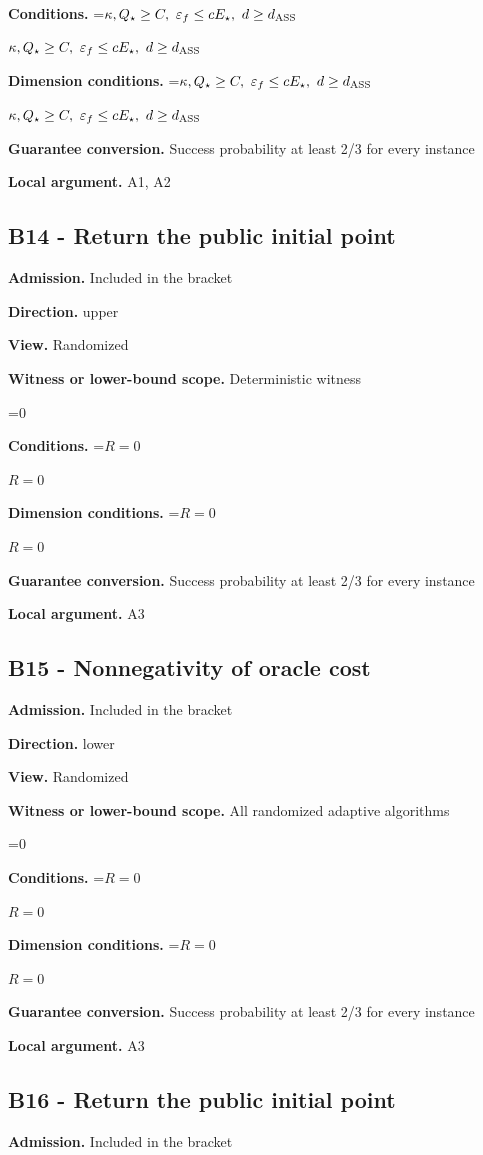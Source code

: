 \documentclass[10pt,a4paper]{article}
\newcommand{\AtlasMath}[1]{\par\begingroup\centering\setbox0=\hbox{$\displaystyle #1$}\ifdim\wd0>1.4\linewidth\typeout{ATLAS WIDE FORMULA: \the\wd0}\fi\ifdim\wd0>\linewidth\resizebox{\linewidth}{!}{\box0}\else\box0\fi\par\endgroup}
\newcommand{\AtlasInlineMath}[1]{\begingroup\setbox0=\hbox{$#1$}\ifdim\wd0>.4\linewidth\endgroup\AtlasMath{#1}\else\endgroup$#1$\fi}
\begin{document}
\textbf{Conditions.} \AtlasInlineMath{\kappa,Q_\star\ge C,\ \varepsilon_f\le cE_\star,\ d\ge d_{\rm ASS}}

\textbf{Dimension conditions.} \AtlasInlineMath{\kappa,Q_\star\ge C,\ \varepsilon_f\le cE_\star,\ d\ge d_{\rm ASS}}

\textbf{Guarantee conversion.} Success probability at least 2/3 for every instance

\textbf{Local argument.} A1, A2

\subsection{B14 - Return the public initial point}
\textbf{Admission.} Included in the bracket

\textbf{Direction.} upper

\textbf{View.} Randomized

\textbf{Witness or lower-bound scope.} Deterministic witness

\AtlasMath{0}
\textbf{Conditions.} \AtlasInlineMath{R=0}

\textbf{Dimension conditions.} \AtlasInlineMath{R=0}

\textbf{Guarantee conversion.} Success probability at least 2/3 for every instance

\textbf{Local argument.} A3

\subsection{B15 - Nonnegativity of oracle cost}
\textbf{Admission.} Included in the bracket

\textbf{Direction.} lower

\textbf{View.} Randomized

\textbf{Witness or lower-bound scope.} All randomized adaptive algorithms

\AtlasMath{0}
\textbf{Conditions.} \AtlasInlineMath{R=0}

\textbf{Dimension conditions.} \AtlasInlineMath{R=0}

\textbf{Guarantee conversion.} Success probability at least 2/3 for every instance

\textbf{Local argument.} A3

\subsection{B16 - Return the public initial point}
\textbf{Admission.} Included in the bracket
\end{document}
